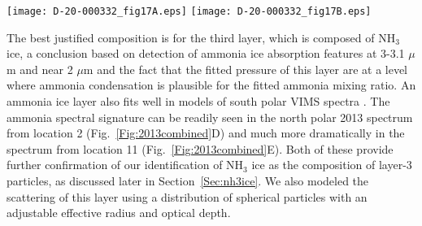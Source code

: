 \documentclass[article,11pt]{emulateapj}
\def\mum{$\mu$m }
\def\pthfx{P$_2$H$_4$}
\def\nht{NH$_3$ }
\begin{document}
\begin{figure*}[!t]\centering
\hspace{-0.15in}\texttt{[image: D-20-000332\_fig17A.eps]}\hspace{-0.15in}
\texttt{[image: D-20-000332\_fig17B.eps]}
\caption{{\bf A:} Equilibrium cloud condensation model (ECCM) of the
  composition and vertical distribution of clouds on Saturn for P $>$
  500 mbar according to \cite{Atreya2005SSR}.  All the ECCM clouds
  have densities expected to greatly exceed actual amounts. For
  P $<$ 500 mb, a cloud layer of unknown composition (possibly P$_4$
  or \pthfx) has been inferred from radiation transfer modeling (see
  text).  The density profile of that cloud is chosen for illustrative
  purposes.  The downward arrow indicates the pressure depth to
  which VIMS observations might be sensitive to cloud
  composition. {\bf B:} Our model structure using four compact
  cloud layers with compositions corresponding to expectations shown in
  A.  Also
  shown is the clear-atmosphere scaled contribution function for
  emission at 5.12 \mum from \cite{Sro2016}.}\label{Fig:eccm}\label{Fig:cloudmodel}
\end{figure*}

The best justified composition is for the third layer, which is
composed of \nht ice, a conclusion based on detection of ammonia ice
absorption features at 3-3.1 \mum and near 2 \mum and the fact that the
fitted pressure of this layer are at a level where ammonia condensation is plausible
for the fitted ammonia mixing ratio. An ammonia ice layer also fits
well in models of south polar VIMS spectra \citep{Sro2020spole}. The
ammonia spectral signature can be readily seen in the north polar 2013 spectrum
from location 2 (Fig.\ \ref{Fig:2013combined}D) and much more
dramatically in the spectrum from location 11
(Fig.\ \ref{Fig:2013combined}E).  Both of these provide
further confirmation of our identification of \nht ice as the
composition of layer-3 particles, as discussed later in Section\ \ref{Sec:nh3ice}.
  We also modeled the scattering of this layer using a
distribution of spherical particles with an adjustable effective
radius and optical depth.  
\end{document}
